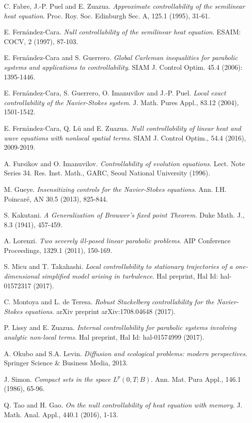 \documentclass{amsart}    %
\begin{document}
 
\begin{thebibliography}{99}

 C. Fabre, J.-P. Puel and E. Zuazua. \emph{Approximate controllability of the semilinear heat equation}. Proc. Roy. Soc. Edinburgh Sec. A, 125.1 (1995), 31-61.

 E. Fern\'andez-Cara. \emph{Null controllability of the semilinear heat equation}. ESAIM: COCV, 2 (1997), 87-103.

 E. Fern\'andez-Cara and S. Guerrero. \emph{Global Carleman inequalities for parabolic systems and applications to controllability}. SIAM J. Control Optim. 45.4 (2006): 1395-1446.

 E. Fern{\'a}ndez-Cara, S. Guerrero, O. Imanuvilov and J.-P. Puel. \emph{Local exact controllability of the Navier-Stokes system}. J. Math. Pures Appl., 83.12 (2004), 1501-1542.

 E. Fern\'andez-Cara, Q. L\"u and E. Zuazua. \emph{Null controllability of linear heat and wave equations with nonlocal spatial terms}. SIAM J. Control Optim., 54.4 (2016), 2009-2019.

 A. Fursikov and O. Imanuvilov. \emph{Controllability of evolution equations}. Lect. Note Series 34. Res. Inst. Math., GARC, Seoul National University (1996).

 M. Gueye. \emph{Insensitizing controls for the Navier-Stokes equations}. Ann. I.H. Poincar\'e, AN 30.5 (2013), 825-844.

 S. Kakutani. \emph{A Generalization of Brouwer's fixed point Theorem}. Duke Math. J., 8.3 (1941),  457-459. 

 A. Lorenzi. \emph{Two severely ill-posed linear parabolic problems}. AIP Conference Proceedings, 1329.1 (2011), 150-169.

 S. Micu and T. Takahashi. \emph{Local controllability to stationary trajectories of a one-dimensional simplified model arising in turbulence}. Hal preprint, Hal Id: hal-01572317 (2017).

 C. Montoya and L. de Teresa. \emph{Robust Stackelberg controllability for the Navier-Stokes equations}. arXiv preprint arXiv:1708.04648 (2017).

 P. Lissy and E. Zuazua. \emph{Internal controllability for parabolic systems involving analytic non-local terms}. Hal preprint, Hal Id: hal-01574999 (2017).

 A. Okubo and S.A. Levin. \emph{Diffusion and ecological problems: modern perspectives}. Springer Science \& Business Media, 2013.

 J. Simon. \emph{Compact sets in the space $L^p(0,T;B)$}. Ann. Mat. Pura Appl., 146.1 (1986), 65-96. 

 Q. Tao and H. Gao. \emph{On the null controllability of heat equation with memory}. J. Math. Anal. Appl., 440.1 (2016), 1-13.
\end{thebibliography}
\end{document}
